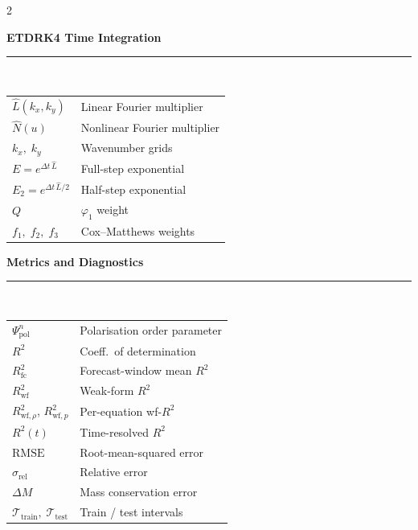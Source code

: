 \begin{multicols}{2}
{\vspace{3pt}\noindent\textbf{ETDRK4 Time Integration}\\[-2pt]
\rule{\columnwidth}{0.4pt}\\[2pt]
\begin{tabular}{@{}p{}p{}@{}}
$\hat{L}(k_x,k_y)$ & Linear Fourier multiplier \\
$\hat{N}(u)$ & Nonlinear Fourier multiplier \\
$k_x,\;k_y$ & Wavenumber grids \\
$E=e^{\Delta t\,\hat{L}}$ & Full-step exponential \\
$E_2=e^{\Delta t\,\hat{L}/2}$ & Half-step exponential \\
$Q$ & $\varphi_1$ weight \\
$f_1,\;f_2,\;f_3$ & Cox--Matthews weights \\
\end{tabular}

\vspace{3pt}\noindent\textbf{Metrics and Diagnostics}\\[-2pt]
\rule{\columnwidth}{0.4pt}\\[2pt]
\begin{tabular}{@{}p{}p{}@{}}
$\Psi_{\mathrm{pol}}^n$ & Polarisation order parameter \\
$R^2$ & Coeff.\ of determination \\
$R^2_{\mathrm{fc}}$ & Forecast-window mean $R^2$ \\
$R^2_{\mathrm{wf}}$ & Weak-form $R^2$ \\
$R^2_{\mathrm{wf},\rho}$, $R^2_{\mathrm{wf},p}$ & Per-equation wf-$R^2$ \\
$R^2(t)$ & Time-resolved $R^2$ \\
$\mathrm{RMSE}$ & Root-mean-squared error \\
$\sigma_{\mathrm{rel}}$ & Relative error \\
$\Delta M$ & Mass conservation error \\
$\mathcal{T}_{\mathrm{train}},\;\mathcal{T}_{\mathrm{test}}$ & Train / test intervals \\
\end{tabular}
}
\end{multicols}
